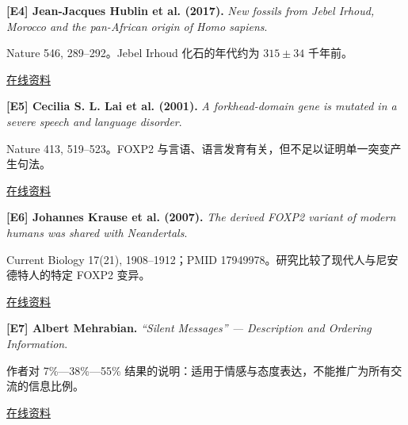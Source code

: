 \par\noindent\begin{minipage}{\linewidth}
\label{ref-4}\noindent\textbf{[E4] Jean-Jacques Hublin et al. (2017).} \textit{New fossils from Jebel Irhoud, Morocco and the pan-African origin of Homo sapiens}.\par\nobreak
Nature 546, 289–292。Jebel Irhoud 化石的年代约为 $315\pm34$ 千年前。\par
{\small\href{https://doi.org/10.1038/nature22336}{在线资料}}\par
\par\end{minipage}\par

\par\noindent\begin{minipage}{\linewidth}
\label{ref-5}\noindent\textbf{[E5] Cecilia S. L. Lai et al. (2001).} \textit{A forkhead-domain gene is mutated in a severe speech and language disorder}.\par\nobreak
Nature 413, 519–523。FOXP2 与言语、语言发育有关，但不足以证明单一突变产生句法。\par
{\small\href{https://doi.org/10.1038/35097076}{在线资料}}\par
\par\end{minipage}\par

\par\noindent\begin{minipage}{\linewidth}
\label{ref-6}\noindent\textbf{[E6] Johannes Krause et al. (2007).} \textit{The derived FOXP2 variant of modern humans was shared with Neandertals}.\par\nobreak
Current Biology 17(21), 1908–1912；PMID 17949978。研究比较了现代人与尼安德特人的特定 FOXP2 变异。\par
{\small\href{https://doi.org/10.1016/j.cub.2007.10.008}{在线资料}}\par
\par\end{minipage}\par

\par\noindent\begin{minipage}{\linewidth}
\label{ref-7}\noindent\textbf{[E7] Albert Mehrabian.} \textit{“Silent Messages” — Description and Ordering Information}.\par\nobreak
作者对 7\%—38\%—55\% 结果的说明：适用于情感与态度表达，不能推广为所有交流的信息比例。\par
{\small\href{https://www.kaaj.com/psych/smorder.html}{在线资料}}\par
\par\end{minipage}\par

